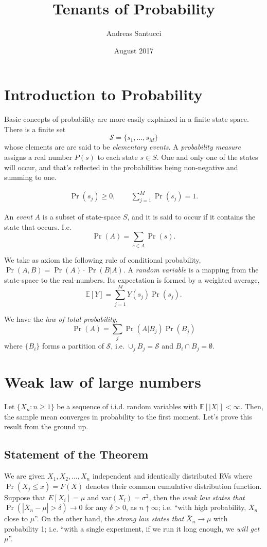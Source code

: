 \documentclass[12pt]{article}\usepackage[]{graphicx}\usepackage[]{color}
\begin{document}
\title{\textbf{Tenants of Probability}}
\author{Andreas Santucci}
\date{August 2017}
\maketitle

\section{Introduction to Probability}
Basic concepts of probability are more easily explained in a finite state space.
There is a finite set
\[
\mathcal S = \{s_1, \ldots, s_M\}
\]
whose elements are are said to be \emph{elementary events}. 
A \emph{probability measure} assigns a real number $P(s)$ to each state $s \in S$.
One and only one of the states will occur, and that's reflected in the probabilities being
non-negative and summing to one.

\begin{align*}   \Pr(s_j) \geq 0, \hspace{25pt} \sum_{j=1}^M \Pr(s_j) = 1. \end{align*}

An \emph{event} $A$ is a subset of state-space $S$, and it is said to occur if it contains the state that occurs. I.e.
\[
\Pr(A) = \sum_{s \in A} \Pr(s).
\]

We take as axiom the following rule of conditional probability, 
$\Pr(A,B) = \Pr(A) \cdot \Pr(B | A)$.
A \emph{random variable} is a mapping from the state-space to the real-numbers. Its expectation is 
formed by a weighted average,
\[
\mathbb E[Y] = \sum_{j=1}^{M} Y(s_j) \Pr(s_j).
\]

We have the \emph{law of total probability},
\[
\Pr(A) = \sum_{j} \Pr(A|B_j) \Pr(B_j)
\]
where $\{B_i\}$ forms a partition of $\mathcal S$, i.e. $\cup_j B_j = \mathcal S$ and $B_i \cap B_j = \emptyset$.

\section{Weak law of large numbers}
Let $\{X_n : n \geq 1\}$ be a sequence of i.i.d. random variables with
$\mathbb E[|X|] < \infty$. Then, the sample mean converges in probability to the first moment.
Let's prove this result from the ground up.

\subsection{Statement of the Theorem} We are given $X_1, X_2, \ldots, X_n$ independent
and identically distributed RVs where $\Pr(X_j \leq x) = F(X)$ denotes 
their common cumulative distribution function. Suppose that $E[X_i]=\mu$
and $\textrm{var}(X_i) = \sigma^2$, then the \emph{weak law states that}
 $\Pr(|\bar{X}_n - \mu| > \delta) \longrightarrow 0$ for any $\delta > 0$,
as $n \uparrow \infty$; i.e.
``with high probability, $\bar{X}_n$ close to $\mu$''. 
On the other hand, the \emph{strong law states that} $\bar{X}_n \longrightarrow \mu$ with probability 1; i.e.
``with a single experiment, if we run it long enough, we \emph{will get} $\mu$''. 
\end{document}
